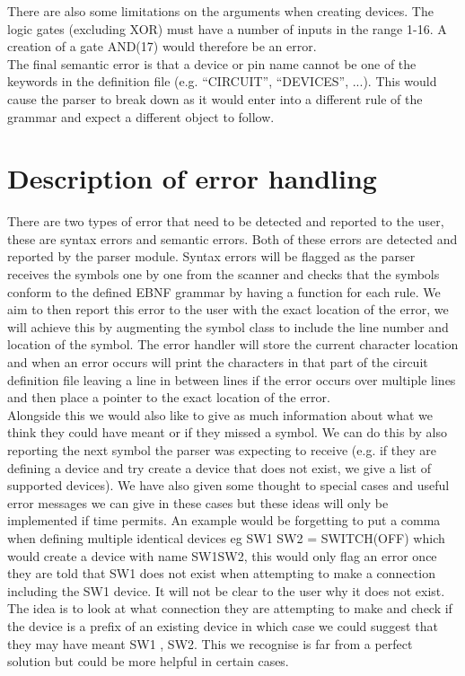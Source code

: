 \documentclass[10pt]{article}
\begin{document}
There are also some limitations on the arguments when creating devices. The logic gates (excluding XOR) must have a number of inputs in the range 1-16. A creation of a gate AND(17) would therefore be an error.\\

The final semantic error is that a device or pin name cannot be one of the keywords in the definition file (e.g. “CIRCUIT”, “DEVICES”, ...). This would cause the parser to break down as it would enter into a different rule of the grammar and expect a different object to follow.

\section{Description of error handling}

There are two types of error that need to be detected and reported to the user, these are syntax errors and semantic errors. Both of these errors are detected and reported by the parser module. Syntax errors will be flagged as the parser receives the symbols one by one from the scanner and checks that the symbols conform to the defined EBNF grammar by having a function for each rule. We aim to then report this error to the user with the exact location of the error, we will achieve this by augmenting the symbol class to include the line number and location of the symbol. The error handler will store the current character location and when an error occurs will print the characters in that part of the circuit definition file leaving a line in between lines if the error occurs over multiple lines and then place a pointer to the exact location of the error. \\

Alongside this we would also like to give as much information about what we think they could have meant or if they missed a symbol. We can do this by also reporting the next symbol the parser was expecting to receive (e.g. if they are defining a device and try create a device that does not exist, we give a list of supported devices). We have also given some thought to special cases and useful error messages we can give in these cases but these ideas will only be implemented if time permits. An example would be forgetting to put a comma when defining multiple identical devices eg SW1 SW2 = SWITCH(OFF) which would create a device with name SW1SW2, this would only flag an error once they are told that SW1 does not exist when attempting to make a connection including the SW1 device. It will not be clear to the user why it does not exist. The idea is to look at what connection they are attempting to make and check if the device is a prefix of an existing device in which case we could suggest that they may have meant SW1 , SW2. This we recognise is far from a perfect solution but could be more helpful in certain cases. \\
\end{document}
